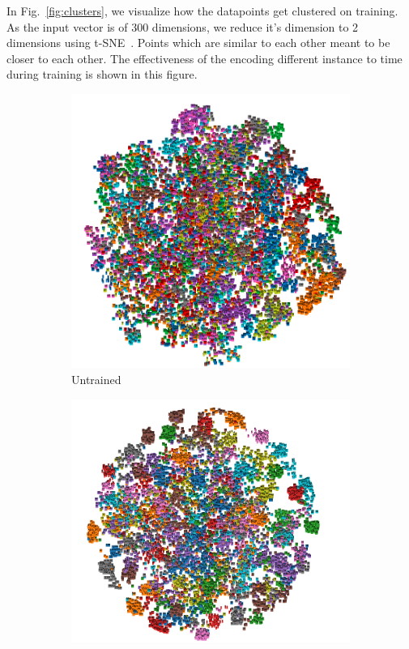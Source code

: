 In Fig.~\ref{fig:clusters}, we visualize how the datapoints get clustered on training.
As the input vector is of 300 dimensions, we reduce it's dimension to 2 dimensions using t-SNE~\cite{tsne}. Points which are similar to each other meant to be closer to each other. The effectiveness of the encoding different instance to time during training is shown in this figure.

\begin{figure}[h]
\begin{subfigure}[b]{0.3\textwidth}
  \includegraphics[width=\textwidth]{figures/untrained.png}  
  \caption{Untrained}
  \label{fig:0e}
\end{subfigure}
\hfill
\begin{subfigure}[b]{0.3\textwidth}
  \includegraphics[width=\textwidth]{figures/5e_tsne.png}  

\end{subfigure}
\end{figure}
